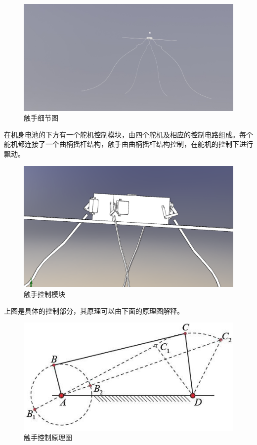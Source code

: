 \documentclass{ctexart}
\begin{document}
\begin{figure}[H]
\centering
    \includegraphics[width = \textwidth]{018}
    \caption{触手细节图}\par
\end{figure}
在机身电池的下方有一个舵机控制模块，由四个舵机及相应的控制电路组成。每个舵机都连接了一个曲柄摇杆结构，触手由曲柄摇杆结构控制，在舵机的控制下进行飘动。
\begin{figure}[H]
\centering
    \includegraphics[width = \textwidth]{019}
    \caption{触手控制模块}\par
\end{figure}
上图是具体的控制部分，其原理可以由下面的原理图解释。
\begin{figure}[H]
\centering
    \includegraphics[width = \textwidth]{020}
    \caption{触手控制原理图}\par
\end{figure}
\end{document}
